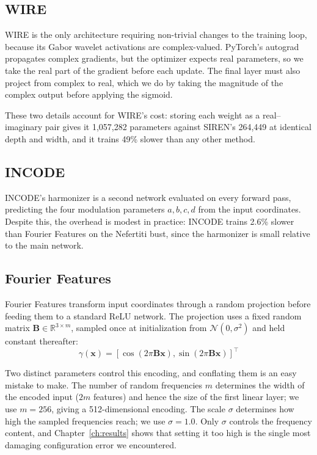 \subsection{WIRE}

WIRE is the only architecture requiring non-trivial changes to the training loop, because its Gabor wavelet activations are complex-valued. PyTorch's autograd propagates complex gradients, but the optimizer expects real parameters, so we take the real part of the gradient before each update. The final layer must also project from complex to real, which we do by taking the magnitude of the complex output before applying the sigmoid.

These two details account for WIRE's cost: storing each weight as a real--imaginary pair gives it 1{,}057{,}282 parameters against SIREN's 264{,}449 at identical depth and width, and it trains 49\% slower than any other method.

\subsection{INCODE}

INCODE's harmonizer is a second network evaluated on every forward pass, predicting the four modulation parameters $a, b, c, d$ from the input coordinates. Despite this, the overhead is modest in practice: INCODE trains 2.6\% slower than Fourier Features on the Nefertiti bust, since the harmonizer is small relative to the main network.

\subsection{Fourier Features}

Fourier Features transform input coordinates through a random projection before feeding them to a standard ReLU network. The projection uses a fixed random matrix $\mathbf{B} \in \mathbb{R}^{3 \times m}$, sampled once at initialization from $\mathcal{N}(0, \sigma^2)$ and held constant thereafter:
\begin{equation}
\gamma(\mathbf{x}) = [\cos(2\pi\mathbf{B}\mathbf{x}), \sin(2\pi\mathbf{B}\mathbf{x})]^\top
\end{equation}

Two distinct parameters control this encoding, and conflating them is an easy mistake to make. The number of random frequencies $m$ determines the width of the encoded input ($2m$ features) and hence the size of the first linear layer; we use $m = 256$, giving a 512-dimensional encoding. The scale $\sigma$ determines how high the sampled frequencies reach; we use $\sigma = 1.0$. Only $\sigma$ controls the frequency content, and Chapter~\ref{ch:results} shows that setting it too high is the single most damaging configuration error we encountered.

